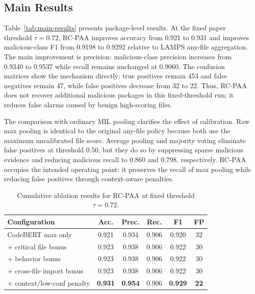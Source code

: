 \documentclass[conference,a4paper]{IEEEtran}
\newcommand{\rcpaa}{RC-PAA}
\newcommand{\codebert}{CodeBERT}
\begin{document}
\subsection{Main Results}
Table~\ref{tab:main-results} presents package-level results. At the fixed paper
threshold $\tau=0.72$, \rcpaa{} improves accuracy from 0.921 to 0.931 and improves
malicious-class F1 from 0.9198 to 0.9292 relative to LAMPS any-file aggregation.
The main improvement is precision: malicious-class precision increases from 0.9340 to
0.9537 while recall remains unchanged at 0.9060. The confusion matrices show the
mechanism directly: true positives remain 453 and false negatives remain 47, while
false positives decrease from 32 to 22. Thus, \rcpaa{} does not recover additional
malicious packages in this fixed-threshold run; it reduces false alarms caused by
benign high-scoring files.

The comparison with ordinary MIL pooling clarifies the effect of calibration. Raw max
pooling is identical to the original any-file policy because both use the maximum
uncalibrated file score. Average pooling and majority voting eliminate false positives
at threshold 0.50, but they do so by suppressing sparse malicious evidence and reducing
malicious recall to 0.860 and 0.798, respectively. \rcpaa{} occupies the intended
operating point: it preserves the recall of max pooling while reducing false positives
through context-aware penalties.

\begin{table}[t]
\centering
\caption{Cumulative ablation results for \rcpaa{} at fixed threshold $\tau=0.72$.}
\label{tab:ablation}
\scriptsize
\begin{tabular}{lccccc}
\toprule
Configuration & Acc. & Prec. & Rec. & F1 & FP \\
\midrule
\codebert{} max only        & 0.921 & 0.934 & 0.906 & 0.920 & 32 \\
$+$ critical file bonus     & 0.923 & 0.938 & 0.906 & 0.922 & 30 \\
$+$ behavior bonus          & 0.923 & 0.938 & 0.906 & 0.922 & 30 \\
$+$ cross-file import bonus & 0.923 & 0.938 & 0.906 & 0.922 & 30 \\
$+$ context/low-conf penalty & \textbf{0.931} & \textbf{0.954} & 0.906 & \textbf{0.929} & \textbf{22} \\
\bottomrule
\end{tabular}
\end{table}
\end{document}
